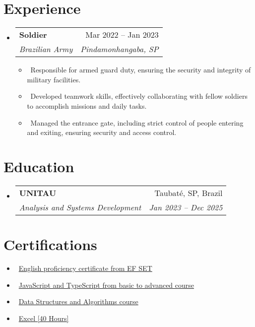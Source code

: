 \documentclass[letterpaper,10pt]{article}
\makeatletter
\newcommand{\resumeItem}[1]{\item\small{#1}}
\newcommand{\resumeSubheading}[4]{
\vspace{-1pt}\item
  \begin{tabular*}{0.97\textwidth}[t]{l@{\extracolsep{\fill}}r}
    \textbf{#1} & #2 \\
    \textit{#3} & \textit{#4} \\
  \end{tabular*}\vspace{-7pt}
}
\newcommand{\resumeSubHeadingList}{\begin{itemize}[leftmargin=0.15in, label={}]}
\newcommand{\resumeSubHeadingListEnd}{\end{itemize}}
\makeatother
\begin{document}
\section{Experience}
\resumeSubHeadingList
  \resumeSubheading
      {Soldier}{Mar 2022 -- Jan 2023}
      {Brazilian Army}{Pindamonhangaba, SP}
      \resumeSubHeadingList
          \resumeItem{\textbullet\ Responsible for armed guard duty, ensuring the security and integrity of military facilities.}
          \resumeItem{\textbullet\ Developed teamwork skills, effectively collaborating with fellow soldiers to accomplish missions and daily tasks.}
          \resumeItem{\textbullet\ Managed the entrance gate, including strict control of people entering and exiting, ensuring security and access control.}
      \resumeSubHeadingListEnd
\resumeSubHeadingListEnd
\section{Education}
\resumeSubHeadingList
  \resumeSubheading
      {UNITAU}{Taubaté, SP, Brazil}
      {Analysis and Systems Development} {Jan 2023 -- Dec 2025}
\resumeSubHeadingListEnd

\section{Certifications}
\resumeSubHeadingList
    \resumeItem{\textbullet\ \normalsize{\href{https://cert.efset.org/KdGLiQ}{English proficiency certificate from EF SET}}}
    \resumeItem{\textbullet\ \normalsize{\href{https://udemy-certificate.s3.amazonaws.com/image/UC-6fc7d4af-701d-446a-b69b-8e167018a749.jpg?v=1706800581000}{JavaScript and TypeScript from basic to advanced course}}}
    \resumeItem{\textbullet\ \normalsize{\href{https://udemy-certificate.s3.amazonaws.com/image/UC-7074fe91-0541-4bfd-bc58-af41912a6361.jpg?v=1703254492000}{Data Structures and Algorithms course}}}
    \resumeItem{\textbullet\ \normalsize{\href{https://www.cursoemvideo.com/validacao-de-certificado/?codigo=798CE-654D-9}{Excel [40 Hours]}}}
\resumeSubHeadingListEnd
\end{document}

